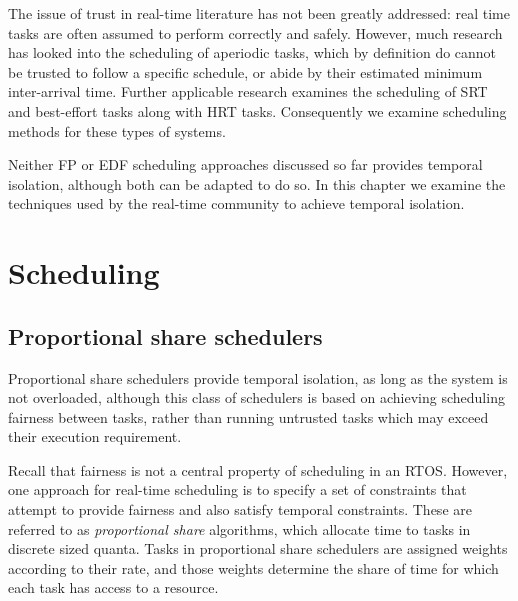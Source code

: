 The issue of trust in real-time literature has not been greatly addressed: real time tasks are often
assumed to perform correctly and safely.  However, much research has looked into the scheduling of
aperiodic tasks, which by definition do cannot be trusted to follow a specific schedule, or abide by
their estimated minimum inter-arrival time. Further applicable research examines the scheduling of
\gls{SRT} and best-effort tasks along with \gls{HRT} tasks. Consequently we examine scheduling methods for
these types of systems. 

Neither \gls{FP} or \gls{EDF} scheduling
approaches discussed so far provides temporal isolation, although both can be adapted to do so.  In
this chapter we examine the techniques used by the real-time community to achieve temporal
isolation.


\section{Scheduling}


\subsection{Proportional share schedulers}

Proportional share schedulers provide temporal isolation, as long as the system is not overloaded,
although this class of schedulers is based on achieving scheduling fairness between tasks, rather
than running untrusted tasks which may exceed their execution requirement. 

Recall that fairness is not a central property of scheduling in an \gls{RTOS}. However, one approach
for real-time scheduling is to specify a set of constraints that attempt to provide fairness and
also satisfy temporal constraints.  These are referred to as \emph{proportional share} algorithms,
which allocate time to tasks in discrete sized quanta. Tasks in proportional share schedulers are assigned 
weights according to their rate, and those weights determine the share of time for which each task 
has access to a resource.

